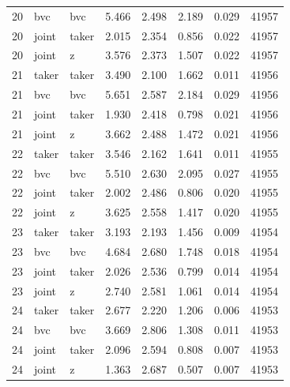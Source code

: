 \begin{tabular}{rllrrrrr}
20 & bvc & bvc & 5.466 & 2.498 & 2.189 & 0.029 & 41957 \\
20 & joint & taker & 2.015 & 2.354 & 0.856 & 0.022 & 41957 \\
20 & joint & z & 3.576 & 2.373 & 1.507 & 0.022 & 41957 \\
21 & taker & taker & 3.490 & 2.100 & 1.662 & 0.011 & 41956 \\
21 & bvc & bvc & 5.651 & 2.587 & 2.184 & 0.029 & 41956 \\
21 & joint & taker & 1.930 & 2.418 & 0.798 & 0.021 & 41956 \\
21 & joint & z & 3.662 & 2.488 & 1.472 & 0.021 & 41956 \\
22 & taker & taker & 3.546 & 2.162 & 1.641 & 0.011 & 41955 \\
22 & bvc & bvc & 5.510 & 2.630 & 2.095 & 0.027 & 41955 \\
22 & joint & taker & 2.002 & 2.486 & 0.806 & 0.020 & 41955 \\
22 & joint & z & 3.625 & 2.558 & 1.417 & 0.020 & 41955 \\
23 & taker & taker & 3.193 & 2.193 & 1.456 & 0.009 & 41954 \\
23 & bvc & bvc & 4.684 & 2.680 & 1.748 & 0.018 & 41954 \\
23 & joint & taker & 2.026 & 2.536 & 0.799 & 0.014 & 41954 \\
23 & joint & z & 2.740 & 2.581 & 1.061 & 0.014 & 41954 \\
24 & taker & taker & 2.677 & 2.220 & 1.206 & 0.006 & 41953 \\
24 & bvc & bvc & 3.669 & 2.806 & 1.308 & 0.011 & 41953 \\
24 & joint & taker & 2.096 & 2.594 & 0.808 & 0.007 & 41953 \\
24 & joint & z & 1.363 & 2.687 & 0.507 & 0.007 & 41953 \\
\bottomrule
\end{tabular}
